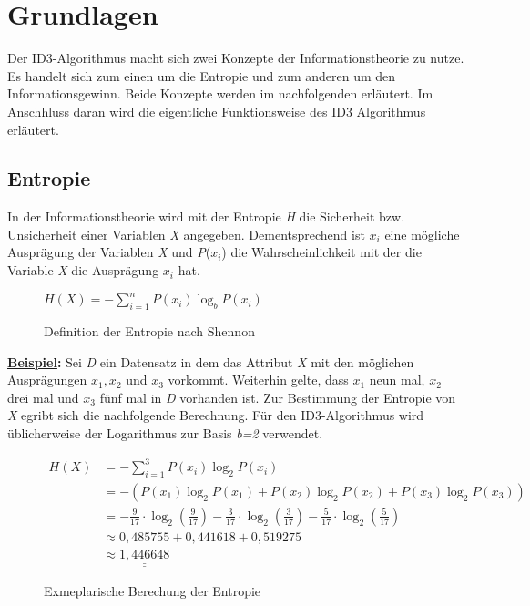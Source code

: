 \section{Grundlagen}
\label{id3:funktionsweise}

Der ID3-Algorithmus macht sich zwei Konzepte der Informationstheorie zu nutze. Es handelt sich zum einen um die Entropie und zum anderen um den Informationsgewinn. Beide Konzepte werden im nachfolgenden erläutert. Im Anschhluss daran wird die eigentliche Funktionsweise des ID3 Algorithmus erläutert.

\subsection{Entropie}
\label{id3:entropie}
In der Informationstheorie wird mit der Entropie \textit{H} die Sicherheit bzw. Unsicherheit  einer Variablen \textit{X} angegeben. Dementsprechend ist $x_{i}$ eine mögliche Ausprägung der Variablen \textit{X} und \textit{P}($x_{i}$) die Wahrscheinlichkeit mit der die Variable \textit{X} die Ausprägung $x_{i}$ hat. \autocite{Entropy:online}

\begin{figure}[htbp]
    \vspace{0.5cm}
    \centering
    $ H(X) = - \sum\limits_{i=1}^{n} P(x_{i}) \log_{b} P(x_{i}) $
    \caption{Definition der Entropie nach Shennon\autocite{Entropy:online}}
\end{figure}

\textbf{\underline{Beispiel}:} Sei \textit{D} ein Datensatz in dem  das Attribut \textit{X} mit den möglichen Ausprägungen $x_{1}, x_{2}$ und $x_{3}$ vorkommt. Weiterhin gelte, dass $x_{1}$ neun mal, $x_{2}$ drei mal und $x_{3}$ fünf mal in \textit{D} vorhanden ist. Zur Bestimmung der Entropie von \textit{X} egribt sich die nachfolgende Berechnung. Für den ID3-Algorithmus wird üblicherweise der Logarithmus zur Basis \textit{b=2} verwendet. \autocite{ImplementationID3}

\begin{figure}[htbp]
    \centering
    \begin{align*}
         H(X)   &= - \sum\limits_{i=1}^{3} P(x_{i}) \log_{2} P(x_{i})\\
                &= - (P(x_{1}) \log_{2} P(x_{1}) + P(x_{2}) \log_{2} P(x_{2}) + P(x_{3}) \log_{2} P(x_{3}))\\
                &= -\frac{9}{17} \cdot \log_{2} \left(\frac{9}{17}\right) - %
                    \frac{3}{17} \cdot \log_{2} \left(\frac{3}{17}\right) - %
                    \frac{5}{17} \cdot \log_{2} \left(\frac{5}{17}\right)\\
                &\approx 0,485755 + 0,441618 + 0,519275\\
                &\approx \underline{\underline{1,446648}}
    \end{align*}
    \caption{Exmeplarische Berechung der Entropie}
\end{figure}
\pagebreak
